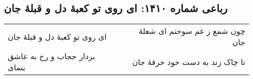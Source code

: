 \begin{center}
\section*{رباعی شماره ۱۴۱۰: ای روی تو کعبهٔ دل و قبلهٔ جان}
\label{sec:1410}
\begin{longtable}{l p{0.5cm} r}
ای روی تو کعبهٔ دل و قبلهٔ جان
&&
چون شمع ز غم سوختم ای شعلهٔ جان
\\
بردار حجاب و رخ به عاشق بنمای
&&
تا چاک زند به دست خود خرقهٔ جان
\\
\end{longtable}
\end{center}
